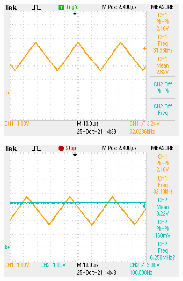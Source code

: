 \documentclass[a4paper,11pt]{article}
\begin{document}
\begin{figure}[h!]
    \centering
    \begin{subfigure}{0.52\textwidth}
        \includegraphics[width=\columnwidth]{spwm/triangle_wave_32kHz.JPG}
    \end{subfigure}
    \begin{subfigure}{0.48\textwidth}
        \includegraphics[width=\columnwidth]{spwm/input_sampling_1.JPG}
    \end{subfigure}
    \begin{subfigure}{0.48\textwidth}

\end{subfigure}
\end{figure}
\end{document}
